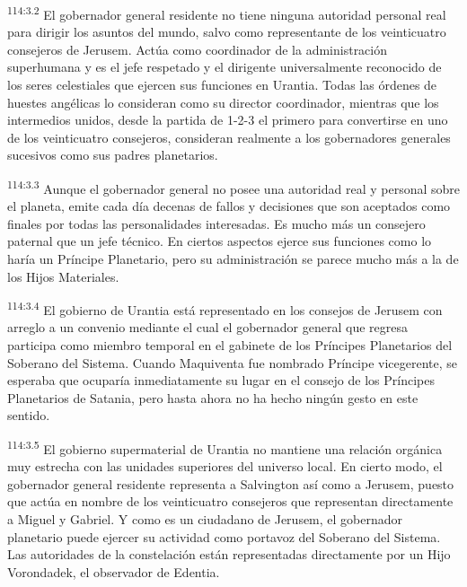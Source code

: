 \par
\textsuperscript{114:3.2} El gobernador general residente no tiene ninguna autoridad personal real para dirigir los asuntos del mundo, salvo como representante de los veinticuatro consejeros de Jerusem. Actúa como coordinador de la administración superhumana y es el jefe respetado y el dirigente universalmente reconocido de los seres celestiales que ejercen sus funciones en Urantia. Todas las órdenes de huestes angélicas lo consideran como su director coordinador, mientras que los intermedios unidos, desde la partida de 1-2-3 el primero para convertirse en uno de los veinticuatro consejeros, consideran realmente a los gobernadores generales sucesivos como sus padres planetarios.

\par
\textsuperscript{114:3.3} Aunque el gobernador general no posee una autoridad real y personal sobre el planeta, emite cada día decenas de fallos y decisiones que son aceptados como finales por todas las personalidades interesadas. Es mucho más un consejero paternal que un jefe técnico. En ciertos aspectos ejerce sus funciones como lo haría un Príncipe Planetario, pero su administración se parece mucho más a la de los Hijos Materiales.

\par
\textsuperscript{114:3.4} El gobierno de Urantia está representado en los consejos de Jerusem con arreglo a un convenio mediante el cual el gobernador general que regresa participa como miembro temporal en el gabinete de los Príncipes Planetarios del Soberano del Sistema. Cuando Maquiventa fue nombrado Príncipe vicegerente, se esperaba que ocuparía inmediatamente su lugar en el consejo de los Príncipes Planetarios de Satania, pero hasta ahora no ha hecho ningún gesto en este sentido.

\par
\textsuperscript{114:3.5} El gobierno supermaterial de Urantia no mantiene una relación orgánica muy estrecha con las unidades superiores del universo local. En cierto modo, el gobernador general residente representa a Salvington así como a Jerusem, puesto que actúa en nombre de los veinticuatro consejeros que representan directamente a Miguel y Gabriel. Y como es un ciudadano de Jerusem, el gobernador planetario puede ejercer su actividad como portavoz del Soberano del Sistema. Las autoridades de la constelación están representadas directamente por un Hijo Vorondadek, el observador de Edentia.

